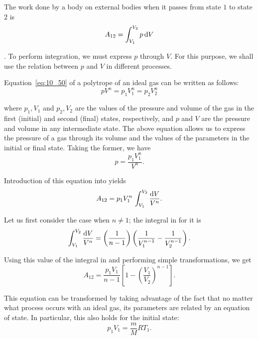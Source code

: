 The work done by a body on external bodies when it passes from state $1$ to state $2$ is
\begin{equation}\label{eq:10_53}
	A_{12} = \int_{V_1}^{V_2} p\,\mathrm{d} V
\end{equation}

. To perform integration, we must express $p$ through $V$. For this purpose, we shall use the relation between $p$ and $V$ in different processes.

Equation~\eqref{eq:10_50} of a polytrope of an ideal gas can be written as follows:
\begin{equation*}
	pV^n = p_1V_1^n = p_2V_2^n
\end{equation*}

\noindent
where $ p_1, V_1$ and $ p_2, V_2$ are the values of the pressure and volume of the gas in the first (initial) and second (final) states, respectively, and $p$ and $V$ are the pressure and volume in any intermediate state. The above equation allows us to express the pressure of a gas through its volume and the values of the parameters in the initial or final state. Taking the former, we have
\begin{equation*}
	p = \frac{p_1V_1^n}{V^n}.
\end{equation*}

\noindent
Introduction of this equation into  yields
\begin{equation}\label{eq:10_54}
	A_{12} = p_1 V_1^n\, \int_{V_1}^{V_2} \frac{\mathrm{d} V}{V^n}.
\end{equation}

\noindent
Let us first consider the case when $n\neq 1$; the integral in  for it is
\begin{equation*}
	\int_{V_1}^{V_2} \frac{\mathrm{d} V}{V^n} = \left(\frac{1}{n-1}\right) \left(\frac{1}{V_1^{n-1}} - \frac{1}{V_2^{n-1}}\right).
\end{equation*}

\noindent
Using this value of the integral in  and performing simple transformations, we get
\begin{equation}\label{eq:10_55}
	A_{12} = \frac{p_1 V_1}{n-1} \left[1 - \left(\frac{V_1}{V_2}\right)^{n-1} \right].
\end{equation}

This equation can be transformed by taking advantage of the fact that no matter what process occurs with an ideal gas, its parameters are related by an equation of state. In particular, this also holds for the initial state:
\begin{equation}\label{eq:10_56}
	p_1 V_1 = \frac{m}{M}RT_1.
\end{equation}

